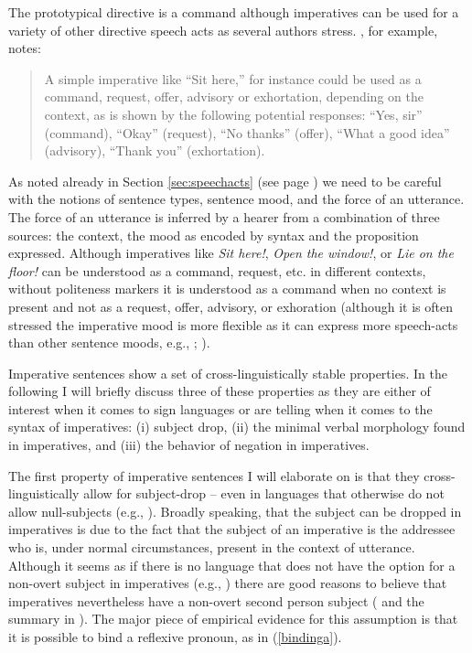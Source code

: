 The prototypical directive is a command \citep[1--2]{aikhenval2010imp} although imperatives can be used for a variety of other directive speech acts as several authors stress. \citet[213]{clark1996using}, for example, notes:

\begin{quote}
A simple imperative like ``Sit here,'' for instance could be used as a command, request, offer, advisory or exhortation, depending on the context, as is shown by the following potential responses: ``Yes, sir'' (command), ``Okay'' (request), ``No thanks'' (offer), ``What a good idea'' (advisory), ``Thank you'' (exhortation).
\end{quote}

\noindent As noted already in Section \ref{sec:speechacts} (see page \pageref{threesources}) we need to be careful with the notions of sentence types, sentence mood, and the force of an utterance. The force of an utterance is inferred by a hearer from a combination of three sources: the context, the mood as encoded by syntax and the proposition expressed. Although imperatives like \textit{Sit here!}, \textit{Open the window!}, or \textit{Lie on the floor!} can be understood as a command, request, etc. in different contexts, without politeness markers it is understood as a command when no context is present and not as a request, offer, advisory, or exhoration (although it is often stressed the imperative mood is more flexible as it can express more speech-acts than other sentence moods, e.g., \citealt{portner2004semantics}; \citealt{kaufmann2012terpreting}).

Imperative sentences show a set of cross-linguistically stable properties. In the following I will briefly discuss three of these properties as they are either of interest when it comes to sign languages or are telling when it comes to the syntax of imperatives: (i) subject drop, (ii) the minimal verbal morphology found in imperatives, and (iii) the behavior of negation in imperatives. 

The first property of imperative sentences I will elaborate on is that they cross-linguistically allow for subject-drop -- even in languages that otherwise do not allow null-subjects (e.g., \citealt{alcazar2014syntax}). Broadly speaking, that the subject can be dropped in imperatives is due to the fact that the subject of an imperative is the addressee who is, under normal circumstances, present in the context of utterance. Although it seems as if there is no language that does not have the option for a non-overt subject in imperatives (e.g., \citealt{sadock1985speech}) there are good reasons to believe that imperatives nevertheless have a non-overt second person subject (\citealt{zwicky1988subject, potsdam1996syntactic} and the summary in \citealt[33--34]{van2007imperatives}). The major piece of empirical evidence for this assumption is that it is possible to bind a reflexive pronoun, as in (\ref{bindinga}).

